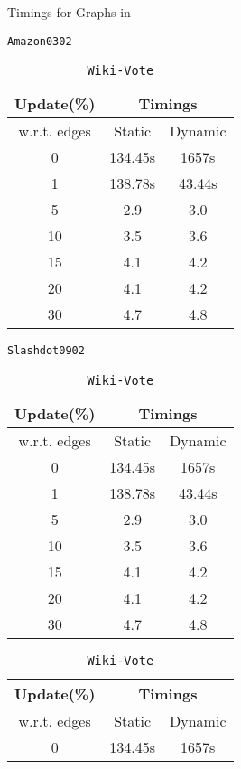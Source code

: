 \begin{table}[H]
    \centering
    \caption{Timings for Graphs in \tableref{\ref{tab:graph_details}} }
\parbox{0.45\linewidth}{
    \centering
    \caption{\texttt{Amazon0302}}
    \label{tab:Amazon0302}
    \begin{tabular}{|c|c|c|}
        \hline
        \textbf{Update(\%)} & \multicolumn{2}{c|}{\textbf{Timings}} \\
        \hline
        w.r.t. edges & Static &  Dynamic \\
        \hline
        0 & 134.45s & 1657s \\
        1 & 138.78s & 43.44s \\
        5 & 2.9 & 3.0 \\
        10 & 3.5 & 3.6 \\
        15 & 4.1 & 4.2 \\
        20 & 4.1 & 4.2 \\
        30 & 4.7 & 4.8 \\
        \hline
    \end{tabular}
}
\hfill
\parbox{0.45\linewidth}{
    \centering
    \caption{\texttt{Slashdot0902}}
    \label{tab:Slashdot0902}
    \begin{tabular}{|c|c|c|}
        \hline
        \textbf{Update(\%)} & \multicolumn{2}{c|}{\textbf{Timings}} \\
        \hline
        w.r.t. edges & Static &  Dynamic \\
        \hline
        0 & 134.45s & 1657s \\
        1 & 138.78s & 43.44s \\
        5 & 2.9 & 3.0 \\
        10 & 3.5 & 3.6 \\
        15 & 4.1 & 4.2 \\
        20 & 4.1 & 4.2 \\
        30 & 4.7 & 4.8 \\
        \hline
    \end{tabular}
}
\hfill
\parbox{0.45\linewidth}{
    \vspace{1.5em}
    \centering
    \caption{\texttt{Wiki-Vote}}
    \label{tab:Wiki-Vote}
    \begin{tabular}{|c|c|c|}
        \hline
        \textbf{Update(\%)} & \multicolumn{2}{c|}{\textbf{Timings}} \\
        \hline
        w.r.t. edges & Static &  Dynamic \\
        \hline
        0 & 134.45s & 1657s \\

\end{tabular}}
\end{table}

